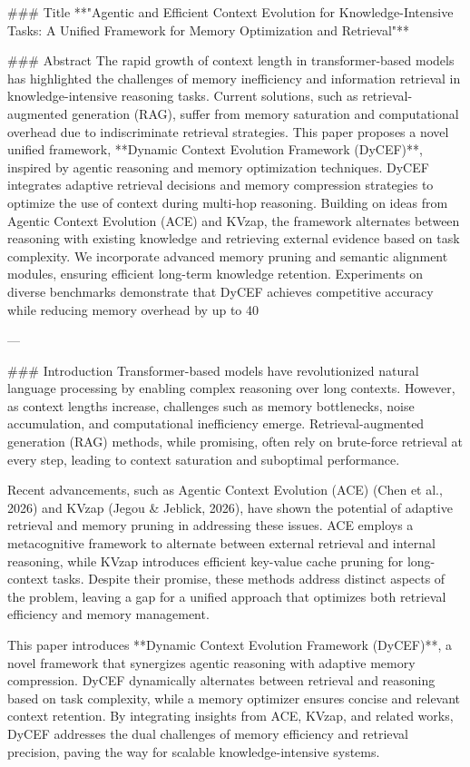 ### Title
**"Agentic and Efficient Context Evolution for Knowledge-Intensive Tasks: A Unified Framework for Memory Optimization and Retrieval"**

### Abstract
The rapid growth of context length in transformer-based models has highlighted the challenges of memory inefficiency and information retrieval in knowledge-intensive reasoning tasks. Current solutions, such as retrieval-augmented generation (RAG), suffer from memory saturation and computational overhead due to indiscriminate retrieval strategies. This paper proposes a novel unified framework, **Dynamic Context Evolution Framework (DyCEF)**, inspired by agentic reasoning and memory optimization techniques. DyCEF integrates adaptive retrieval decisions and memory compression strategies to optimize the use of context during multi-hop reasoning. Building on ideas from Agentic Context Evolution (ACE) and KVzap, the framework alternates between reasoning with existing knowledge and retrieving external evidence based on task complexity. We incorporate advanced memory pruning and semantic alignment modules, ensuring efficient long-term knowledge retention. Experiments on diverse benchmarks demonstrate that DyCEF achieves competitive accuracy while reducing memory overhead by up to 40%

---

### Introduction
Transformer-based models have revolutionized natural language processing by enabling complex reasoning over long contexts. However, as context lengths increase, challenges such as memory bottlenecks, noise accumulation, and computational inefficiency emerge. Retrieval-augmented generation (RAG) methods, while promising, often rely on brute-force retrieval at every step, leading to context saturation and suboptimal performance.

Recent advancements, such as Agentic Context Evolution (ACE) (Chen et al., 2026) and KVzap (Jegou & Jeblick, 2026), have shown the potential of adaptive retrieval and memory pruning in addressing these issues. ACE employs a metacognitive framework to alternate between external retrieval and internal reasoning, while KVzap introduces efficient key-value cache pruning for long-context tasks. Despite their promise, these methods address distinct aspects of the problem, leaving a gap for a unified approach that optimizes both retrieval efficiency and memory management.

This paper introduces **Dynamic Context Evolution Framework (DyCEF)**, a novel framework that synergizes agentic reasoning with adaptive memory compression. DyCEF dynamically alternates between retrieval and reasoning based on task complexity, while a memory optimizer ensures concise and relevant context retention. By integrating insights from ACE, KVzap, and related works, DyCEF addresses the dual challenges of memory efficiency and retrieval precision, paving the way for scalable knowledge-intensive systems.

